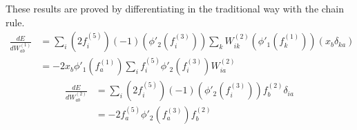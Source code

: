 \documentclass[fleqn]{report}
\begin{document}
These results are proved by differentiating in the traditional way with the chain rule.
\begin{equation}
    \begin{split}
        \frac{d E}{d W^{(1)}_{ab}} & =
        \sum_i \left ( 2 f^{(5)}_i \right ) \left ( -1 \right ) \left ( \phi'_2 \left ( f^{(3)}_i \right ) \right ) \sum_k W^{(2)}_{ik} \left ( \phi'_1 \left ( f^{(1)}_k \right ) \right ) \left ( x_b \delta_{ka} \right ) \\
        & = - 2 x_b \phi'_1 \left (f^{(1)}_a \right ) \sum_i f^{(5)}_i \phi'_2 \left ( f^{(3)}_i \right ) W^{(2)}_{ia}
    \end{split}
\end{equation}
\begin{equation}
    \begin{split}
        \frac{d E}{d W^{(2)}_{ab}} & =
        \sum_i \left ( 2 f^{(5)}_i \right ) \left ( -1 \right ) \left ( \phi'_2 \left ( f^{(3)}_i \right ) \right ) f^{(2)}_b \delta_{ia} \\
        & = - 2 f^{(5)}_a \phi'_2 \left ( f^{(3)}_a \right ) f^{(2)}_b
    \end{split}
\end{equation}
\end{document}
